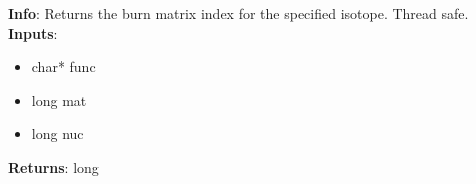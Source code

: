 \textbf{Info}: Returns the burn matrix index for the specified isotope. Thread
safe.\\

\noindent \textbf{Inputs}:
\begin{itemize}
\item{char* func}
\item{long mat}
\item{long nuc}
\end{itemize}

\noindent \textbf{Returns}: long
